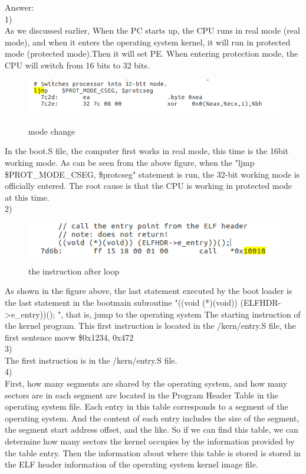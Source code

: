\begin{flushleft}
{\Large Answer:}\\
1)\\
\qquad As we discussed earlier, When the PC starts up, the CPU runs in real mode (real mode), and when it enters the operating system kernel, it will run in protected mode (protected mode).Then it will set PE. When entering protection mode, the CPU will switch from 16 bits to 32 bits.
\begin{figure}[H]
  \centering
  \includegraphics[width=0.8\linewidth]{figure/mode_change}\\
  \caption{mode change}\label{2}
\end{figure}
\qquad In the boot.S file, the computer first works in real mode, this time is the 16bit working mode. As can be seen from the above figure, when the "ljmp \$PROT\_MODE\_CSEG, \$protcseg" statement is run, the 32-bit working mode is officially entered. The root cause is that the CPU is working in protected mode at this time.\\
2)\\
\begin{figure}[H]
  \centering
  \includegraphics[width=0.8\linewidth]{figure/7d6b}\\
  \caption{the instruction after loop}\label{2}
\end{figure}
\qquad As shown in the figure above, the last statement executed by the boot loader is the last statement in the bootmain subroutine "((void (*)(void)) (ELFHDR->e\_entry))(); ", that is, jump to the operating system The starting instruction of the kernel program.
This first instruction is located in the /kern/entry.S file, the first sentence movw \$0x1234, 0x472\\
3)\\
\qquad The first instruction is in the /kern/entry.S file.\\
4)\\
\qquad First, how many segments are shared by the operating system, and how many sectors are in each segment are located in the Program Header Table in the operating system file. Each entry in this table corresponds to a segment of the operating system. And the content of each entry includes the size of the segment, the segment start address offset, and the like. So if we can find this table, we can determine how many sectors the kernel occupies by the information provided by the table entry.
Then the information about where this table is stored is stored in the ELF header information of the operating system kernel image file.\\
\end{flushleft}

